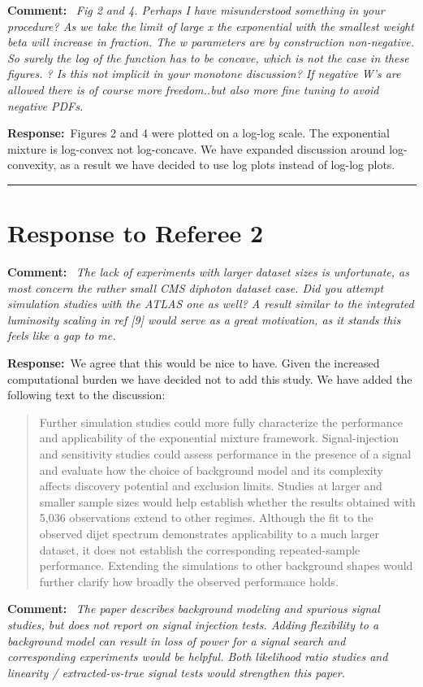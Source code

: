 \documentclass[11pt,a4paper]{article}
\newcommand{\refcomment}[1]{%
    \medskip\noindent\textbf{\color{refcolor}Comment:}\ %
    {\itshape #1}\par\smallskip
}
\newcommand{\response}{\noindent\textbf{Response:}\ }
\newcommand{\addedtext}[1]{%
    \smallskip\begin{quote}\color{quotecolor}\small #1\end{quote}\smallskip
}
\begin{document}
\refcomment{Fig 2 and 4. Perhaps I have misunderstood something in your procedure?
As we take the limit of large x the exponential with the smallest weight beta
will increase in fraction. The w parameters are by construction non-negative.
So surely the log of the function has to be concave, which is not the case in
these figures. ? Is this not implicit in your monotone discussion? If negative
W’s are allowed there is of course more freedom..but also more fine tuning
to avoid negative PDFs.}
\response Figures 2 and 4 were plotted on a log-log scale. The exponential mixture is log-convex not log-concave. We have expanded discussion around log-convexity, as a result we have decided to use log plots instead of log-log plots.

\bigskip
\hrule
\bigskip

\section*{Response to Referee 2}

\refcomment{The lack of experiments with larger dataset sizes is unfortunate, as
most concern the rather small CMS diphoton dataset case. Did you
attempt simulation studies with the ATLAS one as well? A result
similar to the integrated luminosity scaling in ref [9] would serve as a
great motivation, as it stands this feels like a gap to me.}
\response We agree that this would be nice to have. Given the increased computational burden we have decided not to add this study. We have added the following text to the discussion:
\addedtext{Further simulation studies could more fully characterize the performance and applicability of the exponential mixture framework. Signal-injection and sensitivity studies could assess performance in the presence of a signal and evaluate how the choice of background model and its complexity affects discovery potential and exclusion limits. Studies at larger and smaller sample sizes would help establish whether the results obtained with 5,036 observations extend to other regimes. Although the fit to the observed dijet spectrum demonstrates applicability to a much larger dataset, it does not establish the corresponding repeated-sample performance. Extending the simulations to other background shapes would further clarify how broadly the observed performance holds.}

\refcomment{The paper describes background modeling and spurious signal studies,
but does not report on signal injection tests. Adding flexibility to
a background model can result in loss of power for a signal search
and corresponding experiments would be helpful. Both likelihood ratio
studies and linearity / extracted-vs-true signal tests would strengthen
this paper.}
\end{document}
